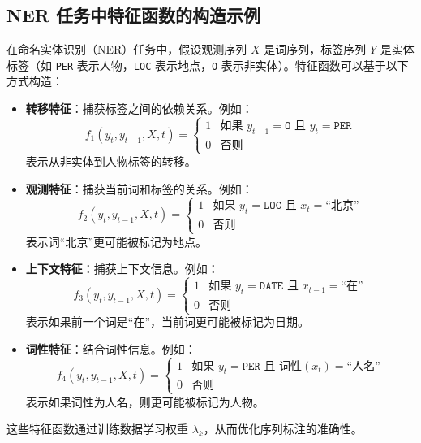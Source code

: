 \documentclass{article}
\begin{document}
\subsection*{NER 任务中特征函数的构造示例}

在命名实体识别（NER）任务中，假设观测序列 \( X \) 是词序列，标签序列 \( Y \) 是实体标签（如 \texttt{PER} 表示人物，\texttt{LOC} 表示地点，\texttt{O} 表示非实体）。特征函数可以基于以下方式构造：

\begin{itemize}
    \item \textbf{转移特征}：捕获标签之间的依赖关系。例如：
    \[
    f_1(y_t, y_{t-1}, X, t) = \begin{cases} 
    1 & \text{如果 } y_{t-1} = \texttt{O} \text{ 且 } y_t = \texttt{PER} \\
    0 & \text{否则}
    \end{cases}
    \]
    表示从非实体到人物标签的转移。

    \item \textbf{观测特征}：捕获当前词和标签的关系。例如：
    \[
    f_2(y_t, y_{t-1}, X, t) = \begin{cases} 
    1 & \text{如果 } y_t = \texttt{LOC} \text{ 且 } x_t = \text{“北京”} \\
    0 & \text{否则}
    \end{cases}
    \]
    表示词“北京”更可能被标记为地点。

    \item \textbf{上下文特征}：捕获上下文信息。例如：
    \[
    f_3(y_t, y_{t-1}, X, t) = \begin{cases} 
    1 & \text{如果 } y_t = \texttt{DATE} \text{ 且 } x_{t-1} = \text{“在”} \\
    0 & \text{否则}
    \end{cases}
    \]
    表示如果前一个词是“在”，当前词更可能被标记为日期。

    \item \textbf{词性特征}：结合词性信息。例如：
    \[
    f_4(y_t, y_{t-1}, X, t) = \begin{cases} 
    1 & \text{如果 } y_t = \texttt{PER} \text{ 且 } \text{词性}(x_t) = \text{“人名”} \\
    0 & \text{否则}
    \end{cases}
    \]
    表示如果词性为人名，则更可能被标记为人物。
\end{itemize}

这些特征函数通过训练数据学习权重 \( \lambda_k \)，从而优化序列标注的准确性。
\end{document}
